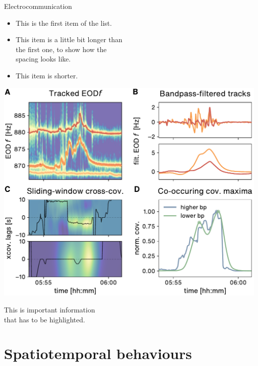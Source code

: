 \documentclass[10pt, aspectratio=169]{beamer}
\newenvironment{items}{
    \begin{itemize}
    \setlength{\itemsep}{10pt}
    \setlength{\parskip}{0pt}
    \setlength{\parsep}{0pt}}{
\end{itemize}
}
\begin{document}
\begin{frame}[fragile]{Electrocommunication}
    \begin{minipage}[c]{0.5\textwidth}
    \begin{items}
        \item This is the first item of the list.
        \item This item is a little bit longer than\\the first one, to  show
            how the \\spacing looks like.
        \item This item is shorter.
    \end{items}
    \end{minipage}%
    \begin{minipage}[c]{0.5\textwidth}
        \vspace{0.5cm}
        \includegraphics[width=\textwidth]{
            assets/CovDetector_backend_ids_26788_26789_index_0.pdf}
    \end{minipage}%
\end{frame}

\begin{frame}[standout]
    This is \alert{important} information\\
    that has to be \alert{highlighted}.
\end{frame}

\section{Spatiotemporal behaviours}
\end{document}
